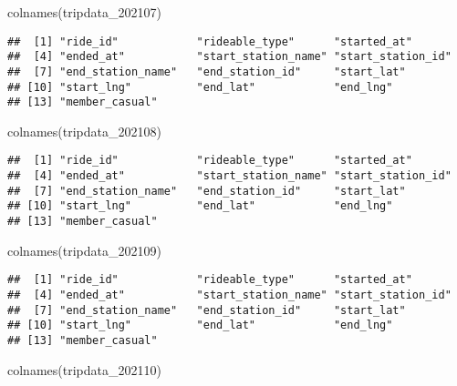 \documentclass[
]{article}
\newenvironment{Shaded}{\begin{snugshade}}{\end{snugshade}}
\newcommand{\FunctionTok}[1]{\textcolor[rgb]{0.00,0.00,0.00}{#1}}
\newcommand{\NormalTok}[1]{#1}
\begin{document}
\begin{Shaded}
\begin{Highlighting}[]
\FunctionTok{colnames}\NormalTok{(tripdata\_202107)}
\end{Highlighting}
\end{Shaded}

\begin{verbatim}
##  [1] "ride_id"            "rideable_type"      "started_at"        
##  [4] "ended_at"           "start_station_name" "start_station_id"  
##  [7] "end_station_name"   "end_station_id"     "start_lat"         
## [10] "start_lng"          "end_lat"            "end_lng"           
## [13] "member_casual"
\end{verbatim}

\begin{Shaded}
\begin{Highlighting}[]
\FunctionTok{colnames}\NormalTok{(tripdata\_202108)}
\end{Highlighting}
\end{Shaded}

\begin{verbatim}
##  [1] "ride_id"            "rideable_type"      "started_at"        
##  [4] "ended_at"           "start_station_name" "start_station_id"  
##  [7] "end_station_name"   "end_station_id"     "start_lat"         
## [10] "start_lng"          "end_lat"            "end_lng"           
## [13] "member_casual"
\end{verbatim}

\begin{Shaded}
\begin{Highlighting}[]
\FunctionTok{colnames}\NormalTok{(tripdata\_202109)}
\end{Highlighting}
\end{Shaded}

\begin{verbatim}
##  [1] "ride_id"            "rideable_type"      "started_at"        
##  [4] "ended_at"           "start_station_name" "start_station_id"  
##  [7] "end_station_name"   "end_station_id"     "start_lat"         
## [10] "start_lng"          "end_lat"            "end_lng"           
## [13] "member_casual"
\end{verbatim}

\begin{Shaded}
\begin{Highlighting}[]
\FunctionTok{colnames}\NormalTok{(tripdata\_202110)}
\end{Highlighting}
\end{Shaded}
\end{document}
